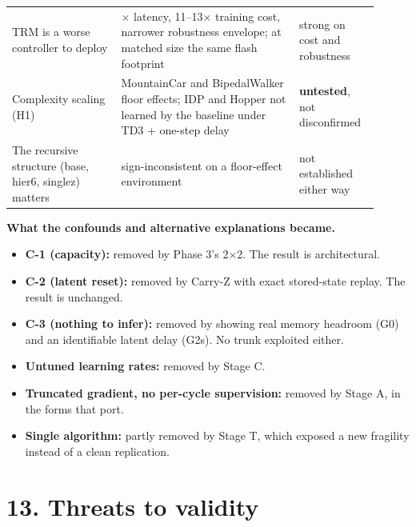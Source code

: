 \documentclass[11pt]{article}
\begin{document}
\begin{center}
\begin{tabular}{>{\raggedright\arraybackslash}p{0.271\linewidth}>{\raggedright\arraybackslash}p{0.448\linewidth}>{\raggedright\arraybackslash}p{0.187\linewidth}}
TRM is a worse controller to deploy & 65$\times$ latency, 11--13$\times$ training cost, narrower robustness envelope; at matched size the same flash footprint & strong on cost and robustness \\
Complexity scaling (H1) & MountainCar and BipedalWalker floor effects; IDP and Hopper not learned by the baseline under TD3 + one-step delay & \textbf{untested}, not disconfirmed \\
The recursive structure (base, hier6, singlez) matters & sign-inconsistent on a floor-effect environment & not established either way \\
\bottomrule
\end{tabular}\end{center}



\textbf{What the confounds and alternative explanations became.}

\begin{itemize}
\item \textbf{C-1 (capacity):} removed by Phase 3's 2$\times$2. The result is architectural.
\item \textbf{C-2 (latent reset):} removed by Carry-Z with exact stored-state replay. The result is unchanged.
\item \textbf{C-3 (nothing to infer):} removed by showing real memory headroom (G0) and an identifiable latent delay (G2s). No trunk exploited either.
\item \textbf{Untuned learning rates:} removed by Stage C.
\item \textbf{Truncated gradient, no per-cycle supervision:} removed by Stage A, in the forms that port.
\item \textbf{Single algorithm:} partly removed by Stage T, which exposed a new fragility instead of a clean replication.
\end{itemize}



\medskip



\section*{13. Threats to validity}
\end{document}
